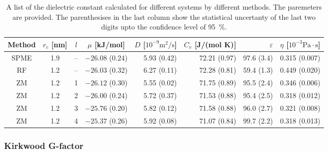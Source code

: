 \documentclass[a4paper,reprint,unsortedaddress,onecolumn]{revtex4-1}
\newcommand{\eps}{\varepsilon}
\begin{document}
\begin{table}
  \centering
  \caption{A list of the dielectric constant calculated for different systems by different methods.
    The paremeters are provided. The parenthesises in the last column show the statistical uncertanty
    of the last two digits upto the confidence level of 95~\%.}
  \begin{tabular*}{0.9\textwidth}{@{\extracolsep{\fill}}cccc rrrr}\hline\hline
    Method      &   $r_c$ [nm] &    $l$     &  $\mu$ [kJ/mol] & $D$ [$10^{-9}\textrm{m}^2/\textrm{s}$] & $C_v$ [J/(mol K)] & $\eps$ & $\eta$ [$10^{-3}\textrm{Pa}\cdot\textrm{s}$] \\\hline
    SPME        &         1.9     &       --      &       $-26.08$ (0.24) & 5.93 (0.42)   & 72.21 (0.97)  & 97.6 (3.4)  & 0.315 (0.007)\\
    RF          &         1.2     & -- & $-26.03$   (0.32)    & 6.27 (0.11)   & 72.28 (0.81)  & 59.4  (1.3)     & 0.449 (0.020) \\
    ZM          &         1.2     &       1       &       $-26.12$ (0.30) & 5.55 (0.02)   & 71.75 (0.89)  & 95.5 (2.4)  & 0.346 (0.006)\\ 
    ZM          &         1.2     &       2       &       $-26.00$ (0.24) & 5.72 (0.37)   & 71.53 (0.88)  & 95.4 (2.5)  & 0.318 (0.012)\\ 
    ZM          &         1.2     &       3       &       $-25.76$ (0.20) & 5.82 (0.12)   & 71.58 (0.88)  & 96.0 (2.7)  & 0.321 (0.008)\\ 
    ZM          &         1.2     &       4       &       $-25.37$ (0.26) & 5.92 (0.08)   & 71.07 (0.84)  & 99.7 (2.2)  & 0.318 (0.013)\\
    \hline\hline
  \end{tabular*}
  \label{tab:tmp2}
\end{table}


\subsubsection{Kirkwood G-factor}
\end{document}
